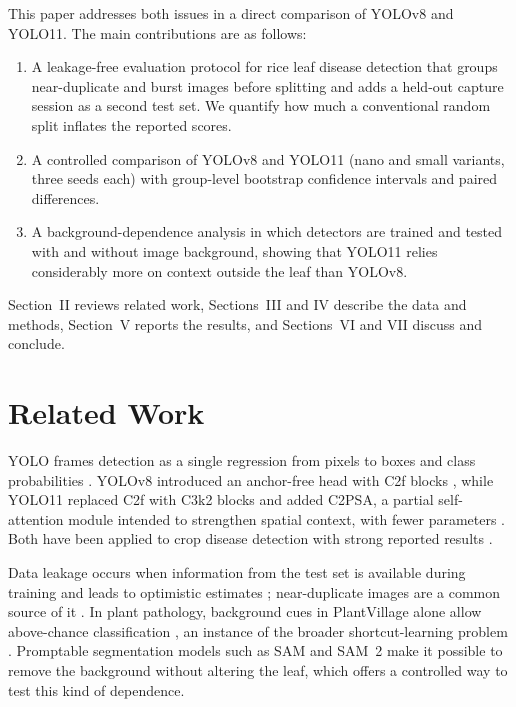 \documentclass[conference]{IEEEtran}
\begin{document}
This paper addresses both issues in a direct comparison of YOLOv8 and YOLO11. The main contributions are as follows:
\begin{enumerate}
\item A leakage-free evaluation protocol for rice leaf disease detection that groups near-duplicate and burst images before splitting and adds a held-out capture session as a second test set. We quantify how much a conventional random split inflates the reported scores.
\item A controlled comparison of YOLOv8 and YOLO11 (nano and small variants, three seeds each) with group-level bootstrap confidence intervals and paired differences.
\item A background-dependence analysis in which detectors are trained and tested with and without image background, showing that YOLO11 relies considerably more on context outside the leaf than YOLOv8.
\end{enumerate}

Section~II reviews related work, Sections~III and IV describe the data and methods, Section~V reports the results, and Sections~VI and VII discuss and conclude.

\section{Related Work}

YOLO frames detection as a single regression from pixels to boxes and class probabilities \cite{redmon2016}. YOLOv8 introduced an anchor-free head with C2f blocks \cite{ultralytics_v8}, while YOLO11 replaced C2f with C3k2 blocks and added C2PSA, a partial self-attention module intended to strengthen spatial context, with fewer parameters \cite{ultralytics_11,khanam2024,hidayatullah2025}. Both have been applied to crop disease detection with strong reported results \cite{yasid2026}.

Data leakage occurs when information from the test set is available during training and leads to optimistic estimates \cite{kapoor2023}; near-duplicate images are a common source of it \cite{barz2020}. In plant pathology, background cues in PlantVillage alone allow above-chance classification \cite{noyan2022}, an instance of the broader shortcut-learning problem \cite{geirhos2020,xiao2021}. Promptable segmentation models such as SAM and SAM~2 \cite{kirillov2023,ravi2024} make it possible to remove the background without altering the leaf, which offers a controlled way to test this kind of dependence.
\end{document}
